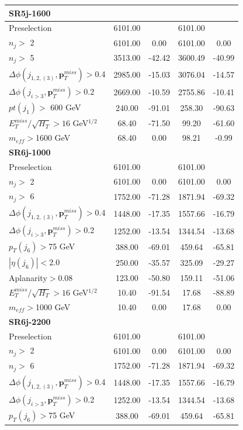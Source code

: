 \documentclass[a4paper,11pt]{article}
\begin{document}
\begin{table}[h]
\begin{tabular}{ | l | c c c c | }
	\multicolumn{5}{|l|}{\textbf{SR5j-1600}} \\ \hline		
	Preselection&6101.00&&6101.00&
	\\
	$n_j>$ 2&6101.00&0.00&6101.00&0.00
	\\
	$n_j>$ 5&3513.00&-42.42&3600.49&-40.99
	\\
	$\Delta \phi(j_{1,2,(3)},\mathbf{p}_T^{miss})>$0.4&2985.00&-15.03&3076.04&-14.57
	\\
	$\Delta \phi(j_{i>3},\mathbf{p}_T^{miss})>$0.2&2669.00&-10.59&2755.86&-10.41
	\\
	$pt(j_1)>$ 600 GeV &240.00&-91.01&258.30&-90.63
	\\
	$E_T^{miss}/\sqrt{H_T}>16 $ GeV$^{1/2}$&68.40&-71.50&99.20&-61.60
	\\
	$m_{eff}>$1600 GeV &68.40&0.00&98.21&-0.99
	\\ \hline
		\multicolumn{5}{|l|}{\textbf{SR6j-1000}} \\ \hline		
	Preselection&6101.00&&6101.00&
	\\
	$n_j>$ 2&6101.00&0.00&6101.00&0.00
	\\
	$n_j>$ 6&1752.00&-71.28&1871.94&-69.32
	\\
	$\Delta \phi(j_{1,2,(3)},\mathbf{p}_T^{miss})>$0.4&1448.00&-17.35&1557.66&-16.79
	\\
	$\Delta \phi(j_{i>3},\mathbf{p}_T^{miss})>$0.2&1252.00&-13.54&1344.54&-13.68
	\\
	$p_T(j_6)>$75 GeV&388.00&-69.01&459.64&-65.81
	\\
	$|\eta(j_6)|<$2.0&250.00&-35.57&325.09&-29.27
	\\
	Aplanarity$>$0.08&123.00&-50.80&159.11&-51.06
	\\
	$E_T^{miss}/\sqrt{H_T}>16 $ GeV$^{1/2}$&10.40&-91.54&17.68&-88.89
	\\
	$m_{eff}>$1000 GeV&10.40&0.00&17.68&0.00
	\\ \hline
			\multicolumn{5}{|l|}{\textbf{SR6j-2200}} \\ \hline		
	Preselection&6101.00&&6101.00&
	\\
	$n_j>$ 2&6101.00&0.00&6101.00&0.00
	\\
	$n_j>$ 6&1752.00&-71.28&1871.94&-69.32
	\\
	$\Delta \phi(j_{1,2,(3)},\mathbf{p}_T^{miss})>$0.4&1448.00&-17.35&1557.66&-16.79
	\\
	$\Delta \phi(j_{i>3},\mathbf{p}_T^{miss})>$0.2&1252.00&-13.54&1344.54&-13.68
	\\
	$p_T(j_6)>$75 GeV&388.00&-69.01&459.64&-65.81
	\\

\end{tabular}
\end{table}
\end{document}
